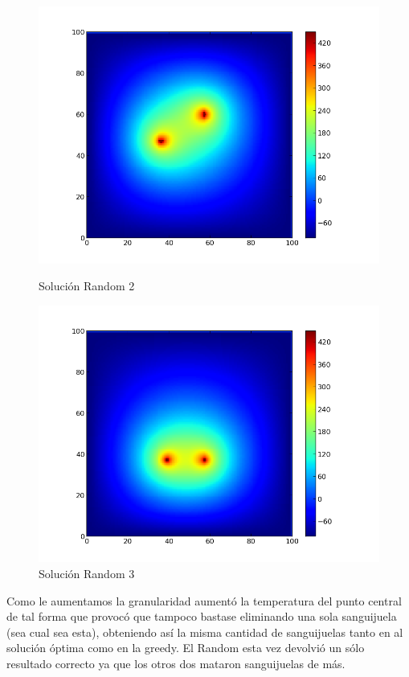 \begin{figure}[htb]
\begin{center}
\includegraphics[scale=0.40]{imagenes/test6_g08_random_2.png} 
\caption{Solución Random 2} 

        \end{center}
\endminipage\hfill
{}
\begin{center}
\includegraphics[scale=0.40]{imagenes/test6_g08_random_3.png} 
\caption{Solución Random 3} 
        \end{center}
\endminipage\hfill 
\end{figure}

Como le aumentamos la granularidad aumentó la temperatura del punto central de tal forma que provocó que tampoco bastase eliminando una sola sanguijuela (sea cual sea esta), obteniendo así la misma cantidad de sanguijuelas tanto en al solución óptima como en la greedy. El Random esta vez devolvió un sólo resultado correcto ya que los otros dos mataron sanguijuelas de más.
